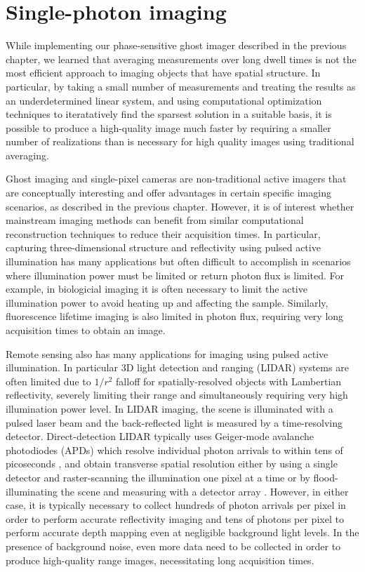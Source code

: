 \chapter{Single-photon imaging}

While implementing our phase-sensitive ghost imager described in the previous chapter, we learned that averaging measurements over long dwell times is not the most efficient approach to imaging objects that have spatial structure. In particular, by taking a small number of measurements and treating the results as an underdetermined linear system, and using computational optimization techniques to iteratatively find the sparsest solution in a suitable basis, it is possible to produce a high-quality image much faster by requiring a smaller number of realizations than is necessary for high quality images using traditional averaging.

Ghost imaging and single-pixel cameras are non-traditional active imagers that are conceptually interesting and offer advantages in certain specific imaging scenarios, as described in the previous chapter. However, it is of interest whether mainstream imaging methods can benefit from similar computational reconstruction techniques to reduce their acquisition times. In particular, capturing three-dimensional structure and reflectivity using pulsed active illumination has many applications \cite{nicolas-applications} but often difficult to accomplish in scenarios where illumination power must be limited or return photon flux is limited. For example, in biologicial imaging it is often necessary to limit the active illumination power to avoid heating up and affecting the sample. Similarly, fluorescence lifetime imaging \cite{becker-fluorescence} is also limited in photon flux, requiring very long acquisition times to obtain an image.

Remote sensing also has many applications for imaging using pulsed active illumination. In particular 3D light detection and ranging (LIDAR) systems are often limited due to $1/r^2$ falloff for spatially-resolved objects with Lambertian reflectivity, severely limiting their range and simultaneously requiring very high illumination power level. In LIDAR imaging, the scene is illuminated with a pulsed laser beam and the back-reflected light is measured by a time-resolving detector. Direct-detection LIDAR typically uses Geiger-mode avalanche photodiodes (APDs) which resolve individual photon arrivals to within tens of picoseconds \cite{savage-single}, and obtain transverse spatial resolution either by using a single detector and raster-scanning the illumination one pixel at a time \cite{buller-ranging} or by flood-illuminating the scene and measuring with a detector array \cite{jack-hgcdte}. However, in either case, it is typically necessary to collect hundreds of photon arrivals per pixel in order to perform accurate reflectivity imaging and tens of photons per pixel to perform accurate depth mapping \cite{albota-three,degnan-photon,snyder-random,obrien-simulation,mccarthy-kilometer,pellegrini-laser} even at negligible background light levels. In the presence of background noise, even more data need to be collected in order to produce high-quality range images, necessitating long acquisition times.

